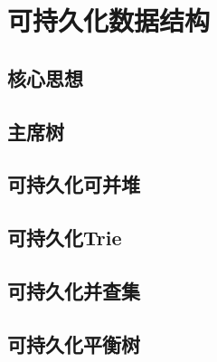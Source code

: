 \section{可持久化数据结构}
\subsection{核心思想}
\subsection{主席树}
\subsection{可持久化可并堆}
\subsection{可持久化Trie}
\subsection{可持久化并查集}
\subsection{可持久化平衡树}